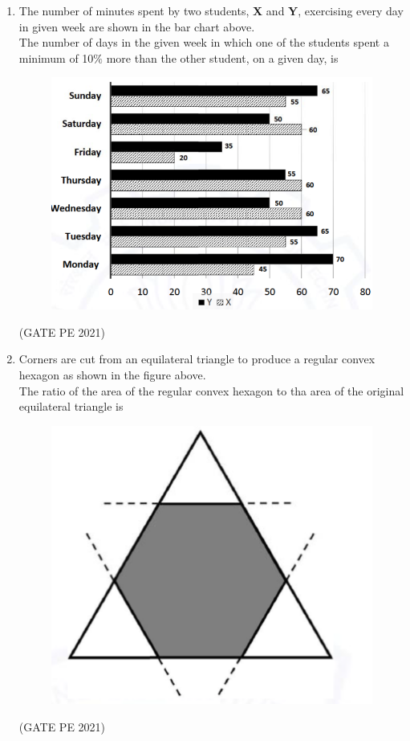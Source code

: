 \documentclass[journal,12pt,onecolumn]{IEEEtran}
\theoremstyle{remark}
\begin{document}
\begin{enumerate}
\item The number of minutes spent by two students, \textbf{X} and \textbf{Y}, exercising every day in given week are shown in the bar chart above.\\
The number of days in the given week in which one of the students spent a minimum of 10$\%$ more than the other student, on a given day, is
\begin{figure}[h]
    \centering
    \includegraphics[width=0.5\columnwidth]{Q_9.png}
    \caption{}
    \label{fig:placeholder}
\end{figure}
\begin{enumerate}
\end{enumerate}
\hfill{(GATE PE 2021)}

\item Corners are cut from an equilateral triangle to produce a regular convex hexagon as shown in the figure above.\\
The ratio of the area of the regular convex hexagon to tha area of the original equilateral triangle is 
\begin{figure}[h]
    \centering
    \includegraphics[width=0.2\columnwidth]{Q_10.png}
    \caption{}
    \label{fig:placeholder}
\end{figure}
\begin{enumerate}
\end{enumerate}
\hfill{(GATE PE 2021)}

\end{enumerate}
\end{document}
